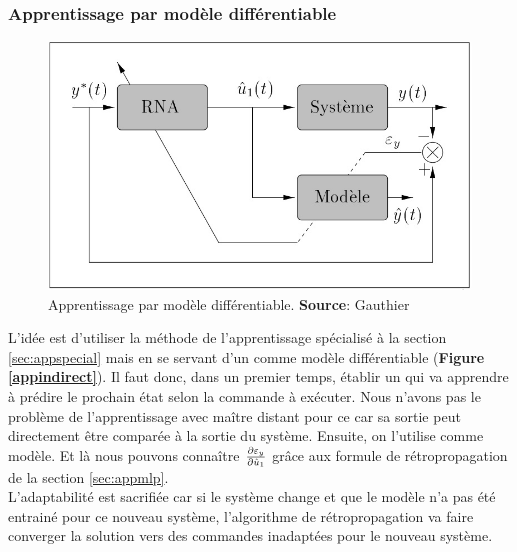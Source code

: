 \subsubsection{Apprentissage par modèle différentiable}\label{sec:appmodele}
\begin{figure}
 \centering
 \includegraphics[scale=0.5]{../figures/modelediferentiable.jpg}
 \caption{Apprentissage par modèle différentiable. \textbf{Source}: Gauthier\cite{Gauthier}}
 \label{appmodele}
\end{figure}

L'idée est d'utiliser la méthode de l'apprentissage spécialisé à la section \ref{sec:appspecial} mais en se servant d'un \rna comme modèle différentiable (\textbf{Figure \ref{appindirect}}).
Il faut donc, dans un premier temps, établir un \rna qui va apprendre à prédire le prochain état selon la commande à exécuter.
Nous n'avons pas le problème de l'apprentissage avec maître distant pour ce \rna car sa sortie peut directement être comparée à la sortie du système.
Ensuite, on l'utilise comme modèle. Et là nous pouvons connaître $\frac{\partial \varepsilon_y}{\partial \hat{u}_1}$ grâce aux formule de rétropropagation de la section \ref{sec:appmlp}.\\

L'adaptabilité est sacrifiée car si le système change et que le modèle n'a pas été entrainé pour ce nouveau système, l'algorithme de rétropropagation va faire converger la solution vers des commandes inadaptées pour le nouveau système.

